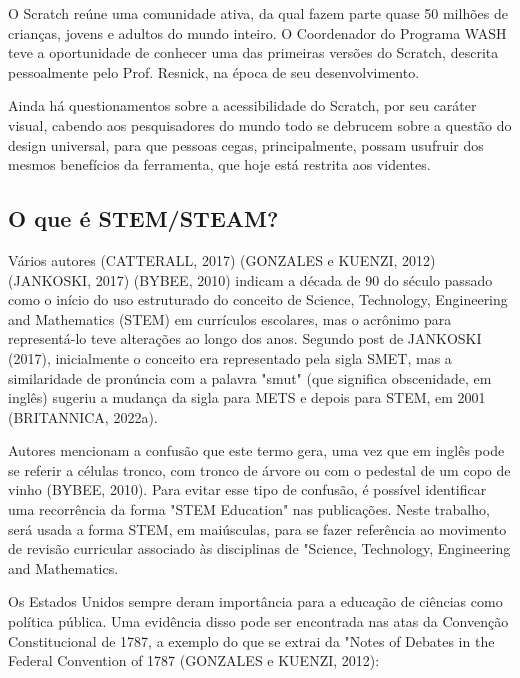 O Scratch reúne uma comunidade ativa, da qual fazem parte quase 50 milhões de crianças, jovens e adultos do mundo inteiro. O Coordenador do Programa WASH teve a oportunidade de conhecer uma das primeiras versões do Scratch, descrita pessoalmente pelo Prof. Resnick, na época de seu desenvolvimento.

Ainda há questionamentos sobre a acessibilidade do Scratch, por seu caráter visual, cabendo aos pesquisadores do mundo todo se debrucem sobre a questão do design universal, para que pessoas cegas, principalmente, possam usufruir dos mesmos benefícios da ferramenta, que hoje está restrita aos videntes.

\subsection[O que é STEM/STEAM?]{O que é STEM/STEAM?}\label{O que é STEM/STEAM?}
Vários autores (CATTERALL, 2017)  (GONZALES e KUENZI, 2012)  (JANKOSKI, 2017)  (BYBEE, 2010) indicam a década de 90 do século passado como o início do uso estruturado do conceito de Science, Technology, Engineering and Mathematics (STEM) em currículos escolares, mas o acrônimo para representá-lo teve alterações ao longo dos anos. 
Segundo post de  JANKOSKI (2017), inicialmente o conceito era representado pela sigla SMET, mas a similaridade de pronúncia com a palavra "smut" (que significa obscenidade, em inglês) sugeriu a mudança da sigla para METS e depois para STEM, em 2001  (BRITANNICA, 2022a).

Autores mencionam a confusão que este termo gera, uma vez que em inglês pode se referir a células tronco, com tronco de árvore ou com o pedestal de um copo de vinho  (BYBEE, 2010). Para evitar esse tipo de confusão, é possível identificar uma recorrência da forma "STEM Education" nas publicações. Neste trabalho, será usada a forma STEM, em maiúsculas, para se fazer referência ao movimento de revisão curricular associado às disciplinas de "Science, Technology, Engineering and Mathematics.

Os Estados Unidos sempre deram importância para a educação de ciências como política pública. Uma evidência disso pode ser encontrada nas atas da Convenção Constitucional de 1787, a exemplo do que se extrai da "Notes of Debates in the Federal Convention of 1787  (GONZALES e KUENZI, 2012):


\noindent\begin{center}\mbox{\centering{}}\end{center}



